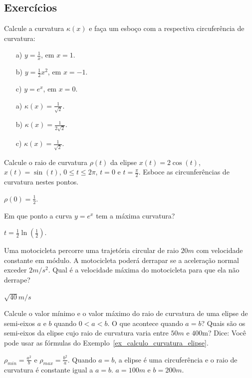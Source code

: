 \subsection*{Exercícios}
\begin{exer}
 Calcule a curvatura $\kappa(x)$ e faça um esboço com a respectiva circuferência de curvatura:
 \begin{itemize}
  \item[a)] $y=\frac{1}{x}$, em $x=1$.
  \item[b)] $y=\frac{1}{2}x^2$, em $x=-1$.
  \item[c)] $y=e^x$, em $x=0$.
 \end{itemize}
 \end{exer}
\begin{resp}
 \begin{itemize}
  \item[a)] $\kappa(x) = \frac{1}{\sqrt{2}}$.
  \item[b)] $\kappa(x) = \frac{1}{2\sqrt{2}}$.
  \item[c)] $\kappa(x) = \frac{1}{\sqrt{2}}$.
 \end{itemize}

\end{resp}

\begin{exer}
  Calcule o raio de curvatura $\rho(t)$ da elipse $x(t)=2\cos(t)$, $x(t)=\sin(t)$, $0\leq t\leq2\pi$, $t=0$ e $t=\frac{\pi}{2}$. Esboce as circunferências de curvatura nestes pontos.
\end{exer}
\begin{resp}
  $\rho(0)=\frac{1}{2}$.
\end{resp}

\begin{exer}
Em que ponto a curva $y=e^x$ tem a máxima curvatura?
\end{exer}
\begin{resp}
 $t=\frac{1}{2}\ln\left(\frac{1}{2}\right)$.
\end{resp}

\begin{exer} Uma motocicleta percorre uma trajetória circular de raio $20m$ com velocidade constante em módulo. A motocicleta poderá derrapar se a aceleração normal exceder $2m/s^2$. Qual é a velocidade máxima do motocicleta para que ela não derrape?
\end{exer}
\begin{resp}
 $\sqrt{40}m/s$
\end{resp}

\begin{exer}
  Calcule o valor mínimo e o valor máximo do raio de curvatura de uma elipse de semi-eixos $a$ e $b$ quando $0<a<b$. O que acontece quando $a=b$? Quais são os semi-eixos da elipse cujo raio de curvatura varia entre $50m$ e $400$m? Dice: Você pode usar as fórmulas do Exemplo~\ref{ex_calculo_curvatura_elipse}.
 \end{exer}
 \begin{resp}
  $\rho_{min}= \frac{a^2}{b}$ e $\rho_{max}= \frac{b^2}{a}$. Quando $a=b$, a elipse é uma circuferência e o raio de curvatura é constante igual a $a=b$. $a=100m$ e $b=200m$.
 \end{resp}


